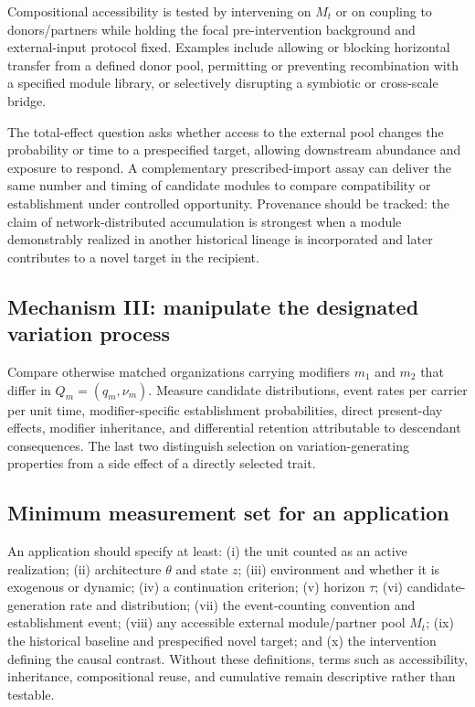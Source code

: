 \documentclass[11pt,a4paper]{article}
\begin{document}
Compositional accessibility is tested by intervening on $M_t$ or on coupling to donors/partners while holding the focal pre-intervention background and external-input protocol fixed. Examples include allowing or blocking horizontal transfer from a defined donor pool, permitting or preventing recombination with a specified module library, or selectively disrupting a symbiotic or cross-scale bridge.

The total-effect question asks whether access to the external pool changes the probability or time to a prespecified target, allowing downstream abundance and exposure to respond. A complementary prescribed-import assay can deliver the same number and timing of candidate modules to compare compatibility or establishment under controlled opportunity. Provenance should be tracked: the claim of network-distributed accumulation is strongest when a module demonstrably realized in another historical lineage is incorporated and later contributes to a novel target in the recipient.

\subsection{Mechanism III: manipulate the designated variation process}

Compare otherwise matched organizations carrying modifiers $m_1$ and $m_2$ that differ in $Q_m=(q_m,\nu_m)$. Measure candidate distributions, event rates per carrier per unit time, modifier-specific establishment probabilities, direct present-day effects, modifier inheritance, and differential retention attributable to descendant consequences. The last two distinguish selection on variation-generating properties from a side effect of a directly selected trait.

\subsection{Minimum measurement set for an application}

An application should specify at least: (i) the unit counted as an active realization; (ii) architecture $\theta$ and state $z$; (iii) environment and whether it is exogenous or dynamic; (iv) a continuation criterion; (v) horizon $\tau$; (vi) candidate-generation rate and distribution; (vii) the event-counting convention and establishment event; (viii) any accessible external module/partner pool $M_t$; (ix) the historical baseline and prespecified novel target; and (x) the intervention defining the causal contrast. Without these definitions, terms such as accessibility, inheritance, compositional reuse, and cumulative remain descriptive rather than testable.
\end{document}

